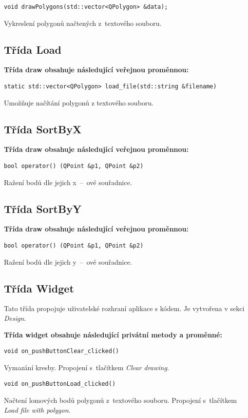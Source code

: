 \documentclass[a4paper, 12pt, oneside, titlepage]{article} %
\begin{document}
\begin{verbatim}
void drawPolygons(std::vector<QPolygon> &data);
\end{verbatim}
Vykreslení polygonů načtených z~textového souboru.\\

\subsection{Třída Load}
\textbf{Třída draw obsahuje následující veřejnou proměnnou:}
\begin{verbatim}
static std::vector<QPolygon> load_file(std::string &filename)
\end{verbatim}
Umožňuje načítání polygonů z textového souboru.\\

\subsection{Třída SortByX}
\textbf{Třída draw obsahuje následující veřejnou proměnnou:}
\begin{verbatim}
bool operator() (QPoint &p1, QPoint &p2)
\end{verbatim}
Ražení bodů dle jejich x~--~ové souřadnice.\\

\subsection{Třída SortByY}
\textbf{Třída draw obsahuje následující veřejnou proměnnou:}
\begin{verbatim}
bool operator() (QPoint &p1, QPoint &p2)
\end{verbatim}
Ražení bodů dle jejich y~--~ové souřadnice.\\

\subsection{Třída Widget}
Tato třída propojuje uživatelské rozhraní aplikace s kódem. Je vytvořena v sekci \emph{Design}.

\textbf{Třída widget obsahuje následující privátní metody a proměnné:}
\begin{verbatim}
void on_pushButtonClear_clicked()
\end{verbatim}
Vymazání kresby. Propojení s~tlačítkem \emph{Clear drawing}.\\

\begin{verbatim}
void on_pushButtonLoad_clicked()
\end{verbatim}
Načtení lomových bodů polygonů z~textového souboru. Propojení s~tlačítkem \emph{Load file with polygon}.\\
\end{document}
